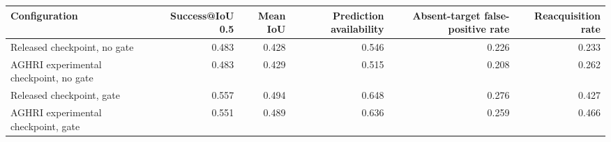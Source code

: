 \begin{tabular}{lrrrrr}
\toprule
                         Configuration &  Success@IoU 0.5 &  Mean IoU &  Prediction availability &  Absent-target false-positive rate &  Reacquisition rate \\
\midrule
          Released checkpoint, no gate &            0.483 &     0.428 &                    0.546 &                              0.226 &               0.233 \\
AGHRI experimental checkpoint, no gate &            0.483 &     0.429 &                    0.515 &                              0.208 &               0.262 \\
             Released checkpoint, gate &            0.557 &     0.494 &                    0.648 &                              0.276 &               0.427 \\
   AGHRI experimental checkpoint, gate &            0.551 &     0.489 &                    0.636 &                              0.259 &               0.466 \\
\bottomrule
\end{tabular}
